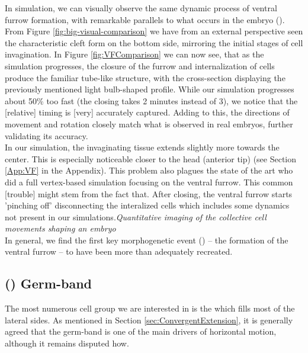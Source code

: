 In simulation, we can visually observe the same dynamic process of ventral furrow formation, with remarkable parallels to what occurs in the embryo (). From Figure \ref{fig:big-visual-comparison} we have from an external perspective seen the characteristic cleft form on the bottom side, mirroring the initial stages of cell invagination. In Figure \ref{fig:VFComparison} we can now see, that as the simulation progresses, the closure of the furrow and internalization of cells produce the familiar tube-like structure, with the cross-section displaying the previously mentioned light bulb-shaped profile. While our simulation progresses about 50\% too fast (the closing takes 2 minutes instead of 3), we notice that the [relative] timing is [very] accurately captured. Adding to this, the directions of movement and rotation closely match what is observed in real embryos, further validating its accuracy. \\

In our simulation, the invaginating tissue extends slightly more towards the center. This is especially noticeable closer to the head (anterior tip) (see Section \ref{App:VF} in the Appendix). This problem also plagues the state of the art  who did a full vertex-based simulation focusing on the ventral furrow. This common [trouble] might stem from the fact that. After closing, the ventral furrow starts 'pinching off' disconnecting the interalized cells which includes some dynamics not present in our simulations.\textit{Quantitative imaging of the collective cell movements shaping an embryo} \\
In general, we find the first key morphogenetic event () -- the formation of the ventral furrow --  to have been more than adequately recreated.

\subsection{() Germ-band}
The most numerous cell group we are interested in is the  which fills most of the lateral sides. As mentioned in Section \ref{sec:ConvergentExtension}, it is generally agreed that the germ-band is one of the main drivers of horizontal motion, although it remains disputed how.

